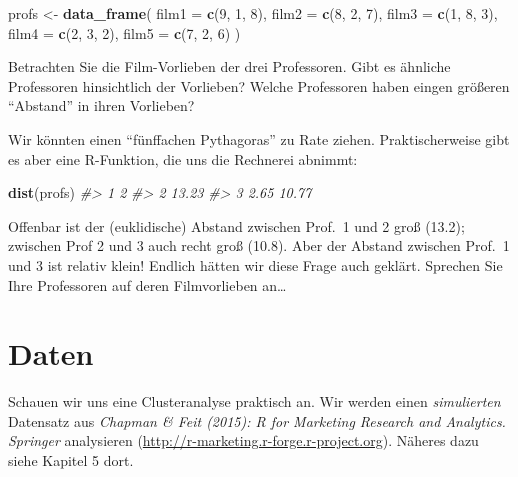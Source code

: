 \documentclass[12pt,ngerman,]{book}
\makeatletter
\newenvironment{Shaded}{\begin{snugshade}}{\end{snugshade}}
\newcommand{\KeywordTok}[1]{\textcolor[rgb]{0.13,0.29,0.53}{\textbf{{#1}}}}
\newcommand{\DataTypeTok}[1]{\textcolor[rgb]{0.13,0.29,0.53}{{#1}}}
\newcommand{\DecValTok}[1]{\textcolor[rgb]{0.00,0.00,0.81}{{#1}}}
\newcommand{\StringTok}[1]{\textcolor[rgb]{0.31,0.60,0.02}{{#1}}}
\newcommand{\CommentTok}[1]{\textcolor[rgb]{0.56,0.35,0.01}{\textit{{#1}}}}
\newcommand{\NormalTok}[1]{{#1}}
\newenvironment{kframe}{%
\medskip{}
\setlength{\fboxsep}{.8em}
 \def\at@end@of@kframe{}%
 \ifinner\ifhmode%
  \def\at@end@of@kframe{\end{minipage}}%
  \begin{minipage}{\columnwidth}%
 \fi\fi%
 \def\FrameCommand##1{\hskip\@totalleftmargin \hskip-\fboxsep
 \colorbox{shadecolor}{##1}\hskip-\fboxsep
     \hskip-\linewidth \hskip-\@totalleftmargin \hskip\columnwidth}%
 \MakeFramed {\advance\hsize-\width
   \@totalleftmargin\z@ \linewidth\hsize
   \@setminipage}}%
 {\par\unskip\endMakeFramed%
 \at@end@of@kframe}
\renewenvironment{Shaded}{\begin{kframe}}{\end{kframe}}
\makeatother
\begin{document}
\begin{Shaded}
\begin{Highlighting}[]
\NormalTok{profs <-}\StringTok{ }\KeywordTok{data_frame}\NormalTok{(}
  \DataTypeTok{film1 =} \KeywordTok{c}\NormalTok{(}\DecValTok{9}\NormalTok{, }\DecValTok{1}\NormalTok{, }\DecValTok{8}\NormalTok{),}
  \DataTypeTok{film2 =} \KeywordTok{c}\NormalTok{(}\DecValTok{8}\NormalTok{, }\DecValTok{2}\NormalTok{, }\DecValTok{7}\NormalTok{),}
  \DataTypeTok{film3 =} \KeywordTok{c}\NormalTok{(}\DecValTok{1}\NormalTok{, }\DecValTok{8}\NormalTok{, }\DecValTok{3}\NormalTok{),}
  \DataTypeTok{film4 =} \KeywordTok{c}\NormalTok{(}\DecValTok{2}\NormalTok{, }\DecValTok{3}\NormalTok{, }\DecValTok{2}\NormalTok{),}
  \DataTypeTok{film5 =} \KeywordTok{c}\NormalTok{(}\DecValTok{7}\NormalTok{, }\DecValTok{2}\NormalTok{, }\DecValTok{6}\NormalTok{)}
\NormalTok{)}
\end{Highlighting}
\end{Shaded}

Betrachten Sie die Film-Vorlieben der drei Professoren. Gibt es ähnliche
Professoren hinsichtlich der Vorlieben? Welche Professoren haben eingen
größeren ``Abstand'' in ihren Vorlieben?

Wir könnten einen ``fünffachen Pythagoras'' zu Rate ziehen.
Praktischerweise gibt es aber eine R-Funktion, die uns die Rechnerei
abnimmt:

\begin{Shaded}
\begin{Highlighting}[]
\KeywordTok{dist}\NormalTok{(profs)}
\CommentTok{#>       1     2}
\CommentTok{#> 2 13.23      }
\CommentTok{#> 3  2.65 10.77}
\end{Highlighting}
\end{Shaded}

Offenbar ist der (euklidische) Abstand zwischen Prof.~1 und 2 groß
(13.2); zwischen Prof 2 und 3 auch recht groß (10.8). Aber der Abstand
zwischen Prof.~1 und 3 ist relativ klein! Endlich hätten wir diese Frage
auch geklärt. Sprechen Sie Ihre Professoren auf deren Filmvorlieben
an\ldots{}

\section{Daten}\label{daten}

Schauen wir uns eine Clusteranalyse praktisch an. Wir werden einen
\emph{simulierten} Datensatz aus \emph{Chapman \& Feit (2015): R for
Marketing Research and Analytics. Springer} analysieren
(\url{http://r-marketing.r-forge.r-project.org}). Näheres dazu siehe
Kapitel 5 dort.
\end{document}
